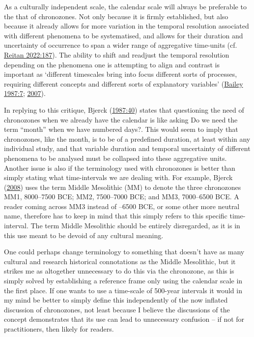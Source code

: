 \documentclass[
  12pt,
  a4paper,
  oneside]{book}
\begin{document}
As a culturally independent scale, the calendar scale will always be preferable to the that of chronozones. Not only because it is firmly established, but also because it already allows for more variation in the temporal resolution associated with different phenomena to be systematised, and allows for their duration and uncertainty of occurrence to span a wider range of aggregative time-units (cf. \protect\hyperlink{ref-reitan2022}{Reitan 2022:187}). The ability to shift and readjust the temporal resolution depending on the phenomena one is attempting to align and contrast is important as `different timescales bring into focus different sorts of processes, requiring different concepts and different sorts of explanatory variables' (\protect\hyperlink{ref-bailey1987}{Bailey 1987:7}; \protect\hyperlink{ref-bailey2007}{2007}).

In replying to this critique, Bjerck (\protect\hyperlink{ref-bjerck1987}{1987:40}) states that questioning the need of chronozones when we already have the calendar is like asking \textquotesingle Do we need the term ``month'' when we have numbered days?\textquotesingle. This would seem to imply that chronozones, like the month, is to be of a predefined duration, at least within any individual study, and that variable duration and temporal uncertainty of different phenomena to be analysed must be collapsed into these aggregative units. Another issue is also if the terminology used with chronozones is better than simply stating what time-intervals we are dealing with. For example, Bjerck (\protect\hyperlink{ref-bjerck2008}{2008}) uses the term Middle Mesolithic (MM) to denote the three chronozones MM1, 8000--7500 BCE; MM2, 7500--7000 BCE; and MM3, 7000--6500 BCE. A reader coming across \textquotesingle MM3\textquotesingle{} instead of --6500 BCE\textquotesingle, or some other more neutral name, therefore has to keep in mind that this simply refers to this specific time-interval. The term Middle Mesolithic should be entirely disregarded, as it is in this use meant to be devoid of any cultural meaning.

One could perhaps change terminology to something that doesn't have as many cultural and research historical connotations as the Middle Mesolithic, but it strikes me as altogether unnecessary to do this via the chronozone, as this is simply solved by establishing a reference frame only using the calendar scale in the first place. If one wants to use a time-scale of 500-year intervals it would in my mind be better to simply define this independently of the now inflated discussion of chronozones, not least because I believe the discussions of the concept demonstrates that its use can lead to unnecessary confusion -- if not for practitioners, then likely for readers.
\end{document}
